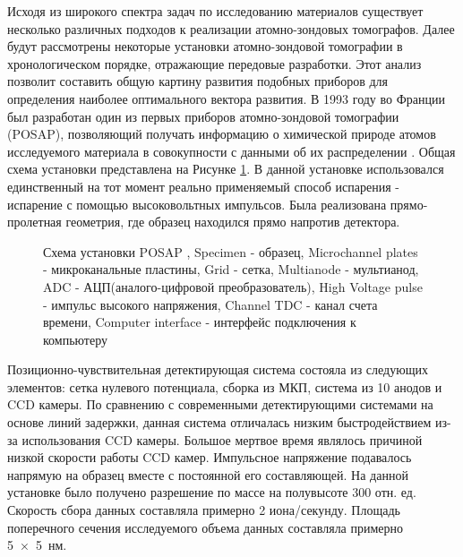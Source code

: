 Исходя из широкого спектра задач по исследованию материалов существует несколько различных подходов к реализации атомно-зондовых томографов. Далее будут рассмотрены некоторые установки атомно-зондовой томографии в хронологическом порядке, отражающие передовые разработки. Этот анализ позволит составить общую картину развития подобных приборов для определения наиболее оптимального вектора развития. В 1993 году во Франции был разработан один из первых приборов атомно-зондовой томографии (POSAP), позволяющий получать информацию о химической природе атомов исследуемого материала в совокупности с данными об их распределении  \cite{Deconihout93}. Общая схема установки представлена на Рисунке \cref{fig:POSAP}. В данной установке использовался единственный на тот момент реально применяемый способ испарения - испарение с помощью высоковольтных импульсов. Была реализована прямо-пролетная геометрия, где образец находился прямо напротив детектора.

\begin{figure}[htb]
	\caption{Схема установки POSAP \cite{Deconihout93}, Specimen - образец, Microchannel plates - микроканальные пластины, Grid - сетка, Multianode - мультианод, ADC - АЦП(аналого-цифровой преобразователь), High Voltage pulse - импульс высокого напряжения, Channel TDC - канал счета времени, Computer interface - интерфейс подключения к компьютеру}
	\label{fig:POSAP}
\end{figure}

Позиционно-чувствительная детектирующая система состояла из следующих элементов: сетка нулевого потенциала, сборка из МКП, система из 10 анодов и CCD камеры. По сравнению с современными детектирующими системами на основе линий задержки, данная система отличалась низким быстродействием из-за использования CCD камеры. Большое мертвое время являлось причиной низкой скорости работы CCD камер. Импульсное напряжение  подавалось напрямую на образец вместе с постоянной его составляющей. На данной установке было получено разрешение по массе на полувысоте 300 отн. ед. Скорость сбора данных составляла примерно 2 иона/секунду. Площадь поперечного сечения исследуемого объема данных составляла примерно 5~×~5~нм.


